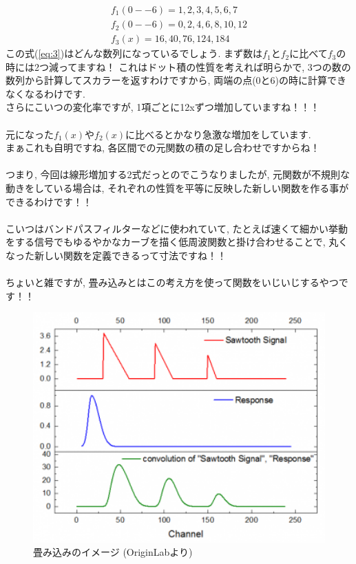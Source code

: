\documentclass[11pt,a4paper]{jreport}
\begin{document}
\begin{eqnarray}
f_1(0--6) = 1,2,3,4,5,6,7\\
f_2(0--6) = 0,2,4,6,8,10,12\\
f_3(x) = 16,40,76, 124, 184
\label{eq:3}
\end{eqnarray}
この式(\ref{eq:3})はどんな数列になっているでしょう. まず数は$f_1$と$f_2$に比べて$f_3$の時には2つ減ってますね！ これはドット積の性質を考えれば明らかで, 3つの数の数列から計算してスカラーを返すわけですから, 両端の点(0と6)の時に計算できなくなるわけです.\\
さらにこいつの変化率ですが, 1項ごとに12xずつ増加していますね！！！\\
\\
元になった$f_1(x)$や$f_2(x)$に比べるとかなり急激な増加をしています. \\
まぁこれも自明ですね, 各区間での元関数の積の足し合わせですからね！\\
\\
つまり, 今回は線形増加する2式だっとのでこうなりましたが, 元関数が不規則な動きをしている場合は, それぞれの性質を平等に反映した新しい関数を作る事ができるわけです！！\\
\\
こいつはバンドパスフィルターなどに使われていて, たとえば速くて細かい挙動をする信号でもゆるやかなカーブを描く低周波関数と掛け合わせることで, 丸くなった新しい関数を定義できるって寸法ですね！！\\
\\
ちょいと雑ですが, 畳み込みとはこの考え方を使って関数をいじいじするやつです！！\\

\begin{figure}[H]
\label{im:convolution}
  \centering
  \includegraphics[width=120mm,bb=0 0 350 276]{figures/Convolution.png}
  \caption{畳み込みのイメージ (OriginLabより)}
\end{figure}
\end{document}

